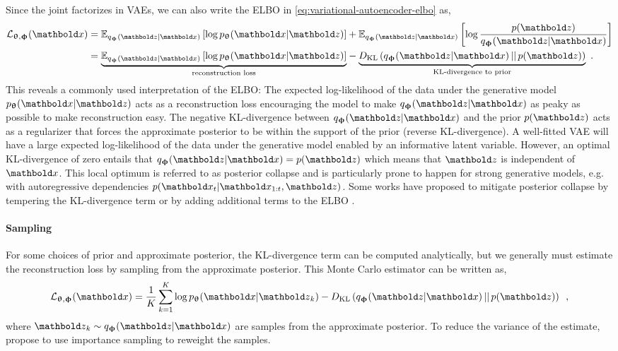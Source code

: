 Since the joint factorizes in VAEs, we can also write the ELBO in \cref{eq:variational-autoencoder-elbo} as,
%
\begin{align} \label{eq:variational-autoencoder-elbo-factorized}
    \mathcal{L}_{\thetab,\phib}(\xb)
    &= \mathbb{E}_{q_\phib(\zb|\xb)}\left[\log p_\thetab(\xb|\zb)\right] + \mathbb{E}_{q_\phib(\zb|\xb)} \left[ \log \frac{p(\zb)}{q_\phib(\zb|\xb)}\right] \nonumber \\
    &= \underset{\text{reconstruction loss}}{\underbrace{\mathbb{E}_{q_\phib(\zb|\xb)}\left[\log p_\thetab(\xb|\zb)\right]}} - \underset{\text{KL-divergence to prior}}{\underbrace{D_\text{KL}\left( q_\phib(\zb|\xb) \,||\, p(\zb) \right)}} \enspace .
\end{align}
%
This reveals a commonly used interpretation of the ELBO: 
The expected log-likelihood of the data under the generative model $p_\thetab(\xb|\zb)$ acts as a reconstruction loss encouraging the model to make $q_\phib(\zb|\xb)$ as peaky as possible to make reconstruction easy. 
The negative KL-divergence between $q_\phib(\zb|\xb)$ and the prior $p(\zb)$ acts as a regularizer that forces the approximate posterior to be within the support of the prior (reverse KL-divergence). 
A well-fitted VAE will have a large expected log-likelihood of the data under the generative model enabled by an informative latent variable. However, an optimal KL-divergence of zero entails that $q_\phib(\zb|\xb) = p(\zb)$ which means that $\zb$ is independent of $\xb$. This local optimum is referred to as posterior collapse and is particularly prone to happen for strong generative models, e.g. with autoregressive dependencies $p(\xb_{t}|\xb_{1:t},\zb)$. Some works have proposed to mitigate posterior collapse by tempering the KL-divergence term \parencite{alemi_fixing_2018,higgins_vvae_2017} or by adding additional terms to the ELBO \parencite{zhao_infovae_2018}. 


\paragraph{Sampling}
For some choices of prior and approximate posterior, the KL-divergence term can be computed analytically, but we generally must estimate the reconstruction loss by sampling from the approximate posterior. 
This Monte Carlo estimator can be written as,
%
\begin{equation} \label{eq:variational-autoencoder-elbo-sampling}
    \mathcal{L}_{\thetab,\phib}(\xb)
    = \frac{1}{K} \sum_{k=1}^K \log p_\thetab(\xb|\zb_k) - D_\text{KL}\left( q_\phib(\zb|\xb) \,||\, p(\zb) \right) \enspace ,
\end{equation}
%
where $\zb_k \sim q_\phib(\zb|\xb)$ are samples from the approximate posterior. To reduce the variance of the estimate, \textcite{burda_importance_2016} propose to use importance sampling to reweight the samples.


